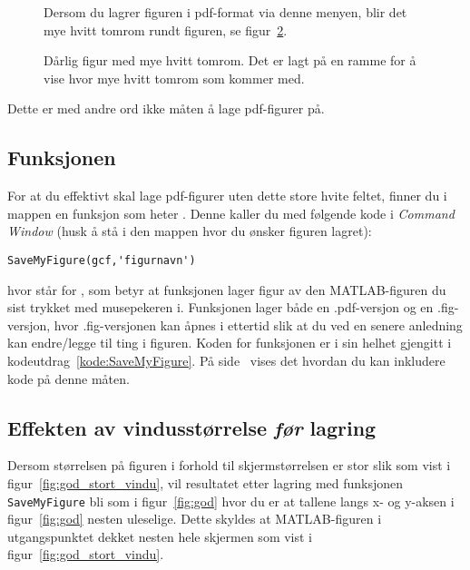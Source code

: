 \begin{figure}[H]
  \centering
  \caption{Dersom du lagrer figuren i pdf-format via denne menyen,
    blir det mye hvitt tomrom rundt figuren, se figur~\ref{fig:daarlig}.} 
  \label{fig:save_as}
\end{figure}

\begin{figure}[H]
  \centering
  \caption{Dårlig figur med mye hvitt tomrom. Det er lagt
    på en ramme for å vise hvor mye hvitt tomrom som kommer med.} 
  \label{fig:daarlig}
\end{figure}
{\color{red}Dette er med andre ord ikke måten å lage pdf-figurer på.}

\subsection{Funksjonen }
For at du effektivt skal lage pdf-figurer uten dette store hvite feltet, finner
du i mappen  en funksjon som heter
. Denne kaller du med følgende kode i {\em
  Command Window} {\color{red}(husk å stå i den mappen hvor du ønsker
  figuren lagret):}

\begin{boxedminipage}{\textwidth} 
\begin{verbatim}
SaveMyFigure(gcf,'figurnavn')
\end{verbatim}
\end{boxedminipage}

hvor  står for , som betyr
at funksjonen lager figur av den MATLAB-figuren du sist trykket med
musepekeren i. Funksjonen lager både en .pdf-versjon
og en .fig-versjon, hvor .fig-versjonen  kan åpnes i ettertid slik at
du ved en 
senere anledning kan endre/legge til ting i figuren.
Koden for funksjonen er i sin helhet gjengitt i
kodeutdrag~\ref{kode:SaveMyFigure}. På side~\pageref{side:kodelisting}
vises det hvordan du kan inkludere kode på denne måten.




\subsection{Effekten av vindusstørrelse {\em før} lagring}
Dersom størrelsen på figuren i forhold til skjermstørrelsen er stor
slik som vist i figur~\ref{fig:god_stort_vindu}, vil resultatet etter lagring med funksjonen
{\tt SaveMyFigure} bli som i figur~\ref{fig:god}
hvor du er at tallene langs x- og y-aksen i figur~\ref{fig:god} nesten
uleselige. 
Dette skyldes at MATLAB-figuren i utgangspunktet dekket nesten hele
skjermen som vist i figur~\ref{fig:god_stort_vindu}.

